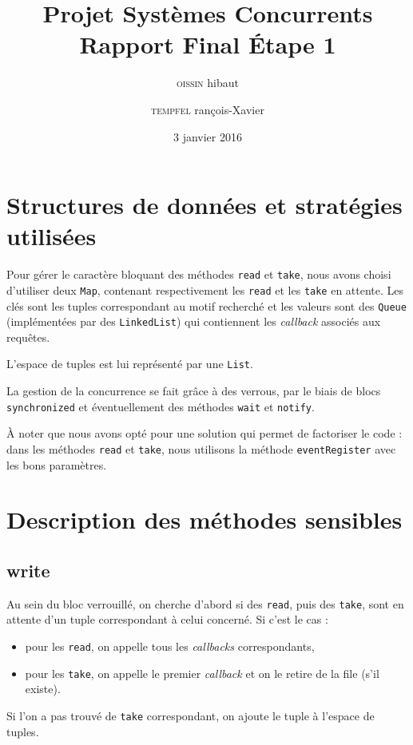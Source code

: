 \documentclass[10pt, a4paper]{article}
\title{\bl{\hrule}\vspace{1em}\Huge\textbf{Projet Systèmes Concurrents \\Rapport Final Étape 1}\\[-0.7em]\bl{\hrule}}
\author{\Large\textsc{\bl{B}oissin} \bl{T}hibaut \and \Large\textsc{\bl{S}tempfel} \bl{F}rançois-Xavier}
\date{3 janvier 2016}
\begin{document}
\sffamily

\maketitle


\vspace{2em}

\section*{Structures de données et stratégies utilisées}

	Pour gérer le caractère bloquant des méthodes \texttt{read} et \texttt{take}, nous avons choisi d'utiliser deux \texttt{Map}, contenant respectivement les \texttt{read} et les \texttt{take} en attente. Les clés sont les tuples correspondant au motif recherché et les valeurs sont des \texttt{Queue} (implémentées par des \texttt{LinkedList}) qui contiennent les \textit{callback} associés aux requêtes.
	
	L'espace de tuples est lui représenté par une \texttt{List}.
	
	La gestion de la concurrence se fait grâce à des verrous, par le biais de blocs \texttt{synchronized} et éventuellement des méthodes \texttt{wait} et \texttt{notify}.
	
	À noter que nous avons opté pour 	une solution qui permet de factoriser le code : dans les méthodes \texttt{read} et \texttt{take}, nous utilisons la méthode \texttt{eventRegister} avec les bons paramètres.
	
\section*{Description des méthodes sensibles}

	\subsection{write}
		Au sein du bloc verrouillé, on cherche d'abord si des \texttt{read}, puis des \texttt{take}, sont en attente d'un tuple correspondant à celui concerné. Si c'est le cas :
		\begin{itemize}
			\item pour les \texttt{read}, on appelle tous les \textit{callbacks} correspondants,
			\item pour les \texttt{take}, on appelle le premier \textit{callback} et on le retire de la file (s'il existe).
		\end{itemize}
		Si l'on a pas trouvé de \texttt{take} correspondant, on ajoute le tuple à l'espace de tuples.
		
\end{document}
